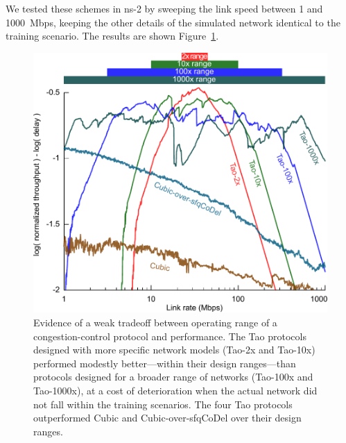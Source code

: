 We tested these schemes in ns-2 by sweeping the link speed between 1
and 1000~Mbps, keeping the other details of the simulated network
identical to the training scenario. The results are shown Figure~\ref{fig:breadth}.

\begin{figure}
\centering
\includegraphics[width=\columnwidth]{figures/parametric-oprange/oprange-manual.pdf}
\caption{Evidence of a weak tradeoff between operating range of a
  congestion-control protocol and performance. The Tao protocols
  designed with more specific network models (Tao-2x and Tao-10x)
  performed modestly better---within their design ranges---than protocols
  designed for a broader range of networks (Tao-100x and Tao-1000x),
  at a cost of deterioration when the actual network did not fall
  within the training scenarios. The four Tao protocols outperformed
  Cubic and Cubic-over-sfqCoDel over their design ranges.}
\label{fig:breadth}
\end{figure}

